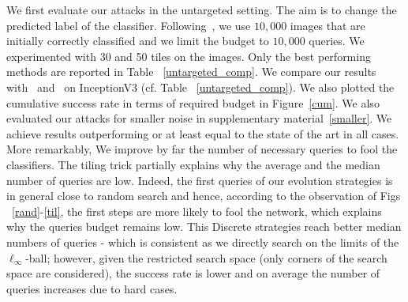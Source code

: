 We first evaluate our attacks in the untargeted setting. The aim is to change the predicted label of the classifier. Following~\citep{moon19aparsimonous,ilyas2018prior}, we use $10,000$ images that are initially correctly classified and we limit the budget to $10,000$ queries. We experimented with 30 and 50 tiles on the images. Only the best performing methods are reported in Table ~\ref{untargeted_comp}.
We compare our results with~\citep{moon19aparsimonous} and~\citep{ilyas2018prior} on InceptionV3 (cf. Table ~\ref{untargeted_comp}). We also plotted the cumulative success rate in terms of required budget in Figure~\ref{cum}. We also evaluated our attacks for smaller noise in supplementary material~\ref{smaller}. We achieve results outperforming or at least equal to  the state of the art in all cases. More remarkably, We improve by far the number of necessary queries to fool the classifiers. The tiling trick partially explains why the average and the median number of queries are low. Indeed, the first queries of our evolution strategies is in general close to random search and hence, according to the observation of Figs ~\ref{rand}-\ref{til}, the first steps are more likely to fool the network, which explains why the queries budget remains low. This Discrete strategies reach better median numbers of queries - which is consistent as we directly search on the limits of the $\ell_\infty$-ball; however, given the restricted search space (only corners of the search space are considered), the success rate is lower and on average the number of queries increases due to hard cases. 



